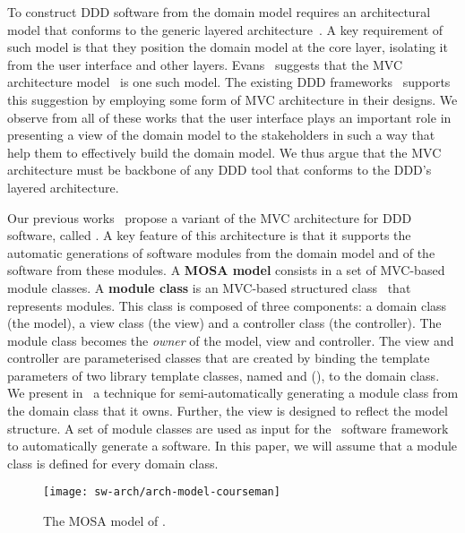 To construct DDD software from the domain model requires an architectural model that conforms to the generic layered architecture~\cite{evans_domain-driven_2004, vernon_implementing_2013}. A key requirement of such model is that they position the domain model at the core layer, isolating it from the user interface and other layers. Evans~\cite{evans_domain-driven_2004} suggests that the MVC architecture model~\cite{krasner_description_1988} is one such model. The existing DDD frameworks~\cite{dan_haywood_apache_2013,paniza_learn_2011} supports this suggestion by employing some form of MVC architecture in their designs. We observe from all of these works that the user interface plays an important role in presenting a view of the domain model to the stakeholders in such a way that help them to effectively build the domain model. We thus argue that the MVC architecture must be backbone of any DDD tool that conforms to the DDD's layered architecture. 

Our previous works~\cite{le_tree-based_2015, le_generative_2017, le_generative_2018} propose a variant of the MVC architecture for DDD software, called . A key feature of this architecture is that it supports the automatic generations of software modules from the domain model and of the software from these modules.
%
A \textbf{MOSA model} consists in a set of MVC-based module classes. 
A \textbf{module class} is an MVC-based structured class~\cite{omg_unified_2015} that represents modules. This class is composed of three components: a domain class (the model), a view class (the view) and a controller class (the controller). The module class becomes the \textit{owner} of the model, view and controller. The view and controller are parameterised classes that are created by binding the template parameters of two library template classes, named  and  (\resp), to the domain class.
%
We present in~\cite{le_generative_2017, le_generative_2018} a technique for semi-automatically generating a module class from the domain class that it owns. Further, the view is designed to reflect the model structure. A set of module classes are used as input for the \jdomainapp~software framework~\cite{le_jdomainapp_2017} to automatically generate a software. In this paper, we will assume that a module class is defined for every domain class.

\begin{figure}[ht]
	\centering
	\texttt{[image: sw-arch/arch-model-courseman]}
	\caption{The MOSA model of \courseman.} %
	\label{fig:arch-model-courseman}
\end{figure}

